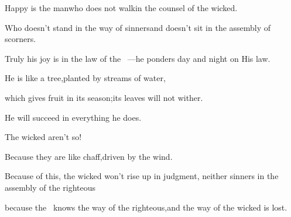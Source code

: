 
\begin{inparaenum}
  \pa{} Happy is the man\pa{}who does not walk\pa{}in the counsel of the wicked.%

  \pb{}Who doesn't stand in the way of sinners\pa{}and doesn't sit in the assembly of scorners.%

  \pa{} Truly his joy is in the law of the \lord~---\pa{}he ponders%
  day and night on His law.%

  \pa{} He is like a tree,\pa{}planted by streams of water,%

  \pb{}which gives fruit in its season;\pa{}its leaves will not wither.%

  \pb{}He will succeed in everything he does.%

  \pb{} The wicked aren't so!%

  \pb{}Because they are like chaff,\pa{}driven by the wind.%

  \pa{} Because of this, the wicked won't rise up in judgment,%
  \pa{}neither sinners in the assembly%
  of the righteous%

  \pa{} because the \lord\ knows the way of the righteous,\pa{}and the way of the wicked is lost.%
\end{inparaenum}

